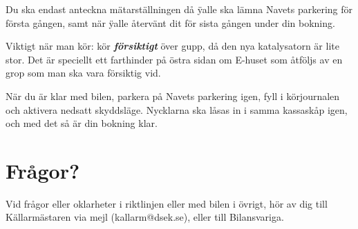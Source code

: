 \documentclass{dsekprotokoll}
\begin{document}
Du ska endast anteckna mätarställningen då \"yalle ska lämna Navets parkering för första gången, samt när \"yalle återvänt dit för sista gången under din bokning.

Viktigt när man kör: kör \emph{\textbf{försiktigt}} över gupp, då den nya katalysatorn är lite stor. Det är speciellt ett farthinder på östra sidan om E-huset som åtföljs av en grop som man ska vara försiktig vid. 

När du är klar med bilen, parkera på Navets parkering igen, fyll i körjournalen och aktivera nedsatt skyddsläge. Nycklarna ska låsas in i samma kassaskåp igen, och med det så är din bokning klar.


\section{Frågor?}
Vid frågor eller oklarheter i riktlinjen eller med bilen i övrigt, hör av dig till Källarmästaren via mejl (kallarm@dsek.se), eller till Bilansvariga.
\end{document}
